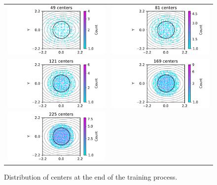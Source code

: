 \documentclass[12pt]{report} %
\begin{document}
\begin{figure}
  \hspace*{-2cm}
  \begin{tabular}{cc}
    \includegraphics[width=.6\textwidth]{imagenes/experiments/2d/pde_runge_2d/circle_c49_runge_2d_gaussian_kernel.pdf} &
    \includegraphics[width=.6\textwidth]{imagenes/experiments/2d/pde_runge_2d/circle_c81_runge_2d_gaussian_kernel.pdf} \\
    \includegraphics[width=.6\textwidth]{imagenes/experiments/2d/pde_runge_2d/circle_c121_runge_2d_gaussian_kernel.pdf} &
    \includegraphics[width=.6\textwidth]{imagenes/experiments/2d/pde_runge_2d/circle_c169_runge_2d_gaussian_kernel.pdf} \\
    \includegraphics[width=.6\textwidth]{imagenes/experiments/2d/pde_runge_2d/circle_c225_runge_2d_gaussian_kernel.pdf}  
  \end{tabular}
  \caption{Distribution of centers at the end of the training process.}
  \label{fig:runge-pde-2d-results-centers}
\end{figure}
\end{document}
